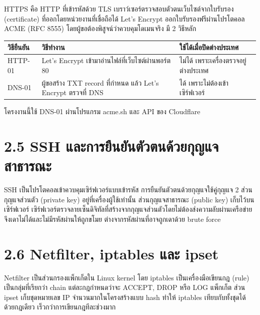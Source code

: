 HTTPS คือ HTTP ที่เข้ารหัสด้วย TLS เบราว์เซอร์ตรวจสอบตัวตนเว็บไซต์จากใบรับรอง (certificate) ที่ออกโดยหน่วยงานที่เชื่อถือได้ Let's Encrypt ออกใบรับรองฟรีผ่านโปรโตคอล ACME (RFC 8555) โดยผู้ขอต้องพิสูจน์ว่าควบคุมโดเมนจริง มี 2 วิธีหลัก

\begingroup\small\begin{longtable}[]{@{}>{\raggedright\arraybackslash}p{}>{\raggedright\arraybackslash}p{}>{\raggedright\arraybackslash}p{}@{}}
\toprule\noalign{}
วิธียืนยัน & วิธีทำงาน & ใช้ได้เมื่อปิดต่างประเทศ \\
\midrule\noalign{}
\endhead
\bottomrule\noalign{}
\endlastfoot
HTTP-01 & Let's Encrypt เข้ามาอ่านไฟล์ที่เว็บไซต์ผ่านพอร์ต 80 & ไม่ได้ เพราะเครื่องตรวจอยู่ต่างประเทศ \\
DNS-01 & ผู้ขอสร้าง TXT record ที่กำหนด แล้ว Let's Encrypt ตรวจที่ DNS & ได้ เพราะไม่ต้องเข้าเซิร์ฟเวอร์ \\
\end{longtable}\endgroup

โครงงานนี้ใช้ DNS-01 ผ่านโปรแกรม acme.sh และ API ของ Cloudflare

\section*{2.5 SSH และการยืนยันตัวตนด้วยกุญแจสาธารณะ}

SSH เป็นโปรโตคอลเข้าควบคุมเซิร์ฟเวอร์แบบเข้ารหัส การยืนยันตัวตนด้วยกุญแจใช้คู่กุญแจ 2 ส่วน กุญแจส่วนตัว (private key) อยู่ที่เครื่องผู้ใช้เท่านั้น ส่วนกุญแจสาธารณะ (public key) เก็บไว้บนเซิร์ฟเวอร์ เซิร์ฟเวอร์ตรวจลายเซ็นดิจิทัลที่สร้างจากกุญแจส่วนตัวโดยไม่ต้องส่งความลับผ่านเครือข่าย จึงเดาไม่ได้และไม่มีรหัสผ่านให้ถูกขโมย ต่างจากรหัสผ่านที่อาจถูกเดาด้วย brute force

\section*{2.6 Netfilter, iptables และ ipset}

Netfilter เป็นส่วนกรองแพ็กเก็ตใน Linux kernel โดย iptables เป็นเครื่องมือเขียนกฎ (rule) เป็นกลุ่มที่เรียกว่า chain แต่ละกฎกำหนดว่าจะ ACCEPT, DROP หรือ LOG แพ็กเก็ต ส่วน ipset เก็บชุดหมายเลข IP จำนวนมากในโครงสร้างแบบ hash ทำให้ iptables เทียบกับทั้งชุดได้ด้วยกฎเดียว เร็วกว่าการเขียนกฎทีละช่วงมาก

